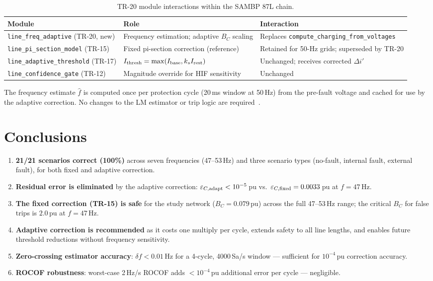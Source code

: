 \documentclass[11pt, a4paper]{article}
\begin{document}
\begin{table}[h]
  \centering
  \caption{TR-20 module interactions within the SAMBP 87L chain.}
  \label{tab:integration}
  \begin{tabular}{lll}
    \toprule
    Module & Role & Interaction \\
    \midrule
    \texttt{line\_freq\_adaptive} (TR-20, new)
      & Frequency estimation; adaptive $B_C$ scaling
      & Replaces \texttt{compute\_charging\_from\_voltages} \\
    \texttt{line\_pi\_section\_model} (TR-15)
      & Fixed pi-section correction (reference)
      & Retained for 50-Hz grids; superseded by TR-20 \\
    \texttt{line\_adaptive\_threshold} (TR-17)
      & $I_{\rm thresh} = \max(I_{\rm base}, k_s I_{\rm rest})$
      & Unchanged; receives corrected $\Delta i'$ \\
    \texttt{line\_confidence\_gate} (TR-12)
      & Magnitude override for HIF sensitivity
      & Unchanged \\
    \bottomrule
  \end{tabular}
\end{table}

The frequency estimate $\hat{f}$ is computed once per protection cycle
(20\,ms window at 50\,Hz) from the pre-fault voltage and cached for use
by the adaptive correction.  No changes to the LM estimator or trip logic
are required~\cite{IEEE_C37_243}.


\section{Conclusions}
\label{sec:conclusions}

\begin{enumerate}
  \item \textbf{21/21 scenarios correct (100\%)} across seven frequencies
        (47--53\,Hz) and three scenario types (no-fault, internal fault,
        external fault), for both fixed and adaptive correction.
  \item \textbf{Residual error is eliminated} by the adaptive correction:
        $\varepsilon_{C,\rm adapt} < 10^{-5}$\,pu vs.\
        $\varepsilon_{C,\rm fixed} = 0.0033$\,pu at $f=47$\,Hz.
  \item \textbf{The fixed correction (TR-15) is safe} for the study network
        ($B_C = 0.079$\,pu) across the full 47--53\,Hz range; the
        critical $B_C$ for false trips is $2.0$\,pu at $f=47$\,Hz.
  \item \textbf{Adaptive correction is recommended} as it costs one multiply
        per cycle, extends safety to all line lengths, and enables future
        threshold reductions without frequency sensitivity.
  \item \textbf{Zero-crossing estimator accuracy}: $\delta f < 0.01$\,Hz
        for a 4-cycle, 4000\,Sa/s window — sufficient for $10^{-4}$\,pu
        correction accuracy.
  \item \textbf{ROCOF robustness}: worst-case 2\,Hz/s ROCOF adds
        $<10^{-4}$\,pu additional error per cycle — negligible.
\end{enumerate}
\end{document}
